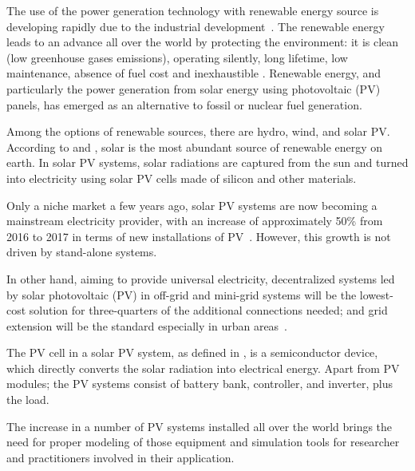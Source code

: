 The use of the power generation technology with renewable energy source is developing rapidly due to the industrial development~\cite{Yatimi}. The renewable energy leads to an advance all over the world by protecting the environment: it is clean (low greenhouse gases emissions), operating silently, long lifetime, low maintenance, absence of fuel cost and inexhaustible \cite{Noroozian}. Renewable energy, and particularly the power generation from solar energy using photovoltaic (PV) panels, has emerged as an alternative to fossil or nuclear fuel generation. 

Among the options of renewable sources, there are hydro, wind, and solar PV. According to \cite{SEIA} and \cite{Chauhan}, solar is the most abundant source of renewable energy on earth. In solar PV systems, solar radiations are captured from the sun and turned into electricity using solar PV cells made of silicon and other materials.

Only a niche market a few years ago, solar PV systems are now becoming a mainstream electricity provider, with an increase of approximately 50\% from 2016 to 2017 in terms of new installations of PV~\cite{EPIA}. However, this growth is not driven by stand-alone systems.

In other hand, aiming to provide universal electricity, decentralized systems led by solar photovoltaic (PV) in off-grid and mini-grid systems will be the lowest-cost solution for three-quarters of the additional connections needed; and grid extension will be the standard especially in urban areas~\cite{IEAweo2018}.

The PV cell in a solar PV system, as defined in \cite{Rawat}, is a semiconductor device, which directly converts the solar radiation into electrical energy. Apart from PV modules; the PV systems consist of battery bank, controller, and inverter, plus the load.
%
%

The increase in a number of PV systems installed all over the world brings the need for proper modeling of those equipment and simulation tools for researcher and practitioners involved in their application. 

